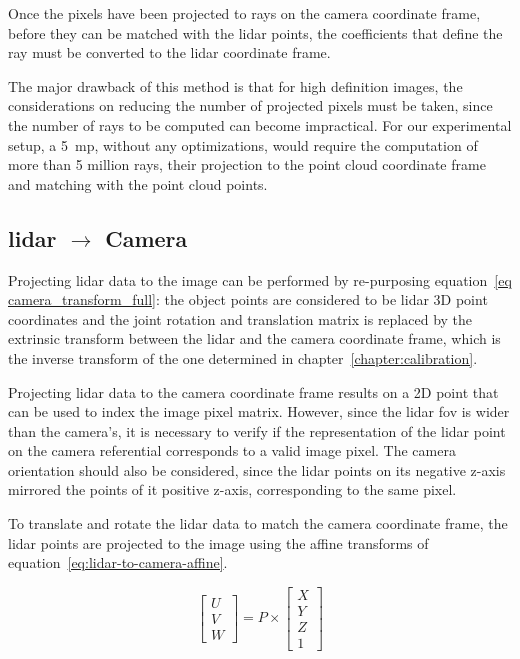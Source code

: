 Once the pixels have been projected to rays on the camera coordinate frame, before they can be matched with the \ac{lidar} points, the coefficients that define the ray must be converted to the \ac{lidar} coordinate frame.

The major drawback of this method is that for high definition images, the considerations on reducing the number of projected pixels must be taken, since the number of rays to be computed can become impractical. For our experimental setup, a 5~\ac{mp}, without any optimizations, would require the computation of more than 5 million rays, their projection to the point cloud coordinate frame and matching with the point cloud points.


\subsection{\ac{lidar} $\rightarrow$ Camera}
\label{subsec:sensor-fusion-lidar-to-camera}
Projecting \ac{lidar} data to the image can be performed by re-purposing equation~\ref{eq camera_transform_full}: the object points are considered to be \ac{lidar} 3D point coordinates and the joint rotation and translation matrix is replaced by the extrinsic transform between the \ac{lidar} and the camera coordinate frame, which is the inverse transform of the one determined in chapter~\ref{chapter:calibration}.

Projecting \ac{lidar} data to the camera coordinate frame results on a 2D point that can be used to index the image pixel matrix. However, since the \ac{lidar} \ac{fov} is wider than the camera's, it is necessary to verify if the representation of the \ac{lidar} point on the camera referential corresponds to a valid image pixel. The camera orientation should also be considered, since the \ac{lidar} points on its negative z-axis mirrored the points of it positive z-axis, corresponding to the same pixel.

To translate and rotate the \ac{lidar} data to match the camera coordinate frame, the \ac{lidar} points are projected to the image using the affine transforms of equation~\ref{eq:lidar-to-camera-affine}. 

\begin{equation}
	\label{eq:lidar-to-camera-affine}
		\begin{bmatrix}
			U \\
			V \\
			W
		\end{bmatrix}
		= P \times
		\begin{bmatrix}
			X \\
			Y \\
			Z \\
			1
		\end{bmatrix}
\end{equation}

